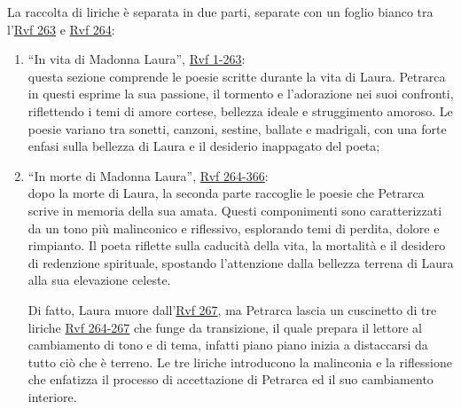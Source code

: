 \documentclass{article}
\begin{document}
La raccolta di liriche è separata in due parti, separate con un foglio bianco tra
l'\underline{Rvf 263} e \underline{Rvf 264}:
\begin{enumerate}[label=Parte \arabic*.]
    \item ``In vita di Madonna Laura'', \underline{Rvf 1-263}:\\
        questa sezione comprende le poesie scritte durante la vita di Laura. Petrarca in questi
        esprime la sua passione, il tormento e l'adorazione nei suoi confronti, riflettendo i
        temi di amore cortese, bellezza ideale e struggimento amoroso. Le poesie variano tra
        sonetti, canzoni, sestine, ballate e madrigali, con una forte enfasi sulla bellezza di
        Laura e il desiderio inappagato del poeta;
    \item ``In morte di Madonna Laura'', \underline{Rvf 264-366}:\\
        dopo la morte di Laura, la seconda parte raccoglie le poesie che Petrarca scrive in
        memoria della sua amata. Questi componimenti sono caratterizzati da un tono più
        malinconico e riflessivo, esplorando temi di perdita, dolore e rimpianto. Il poeta
        riflette sulla caducità della vita, la mortalità e il desidero di redenzione spirituale,
        spostando l'attenzione dalla bellezza terrena di Laura alla sua elevazione celeste.

        Di fatto, Laura muore dall'\underline{Rvf 267}, ma Petrarca lascia un cuscinetto di
        tre liriche \underline{Rvf 264-267} che funge da transizione, il quale prepara il
        lettore al cambiamento di tono e di tema, infatti piano piano inizia a distaccarsi da
        tutto ciò che è terreno. Le tre liriche introducono la malinconia e la riflessione che
        enfatizza il processo di accettazione di Petrarca ed il suo cambiamento interiore.
\end{enumerate}

\newpage
\end{document}
